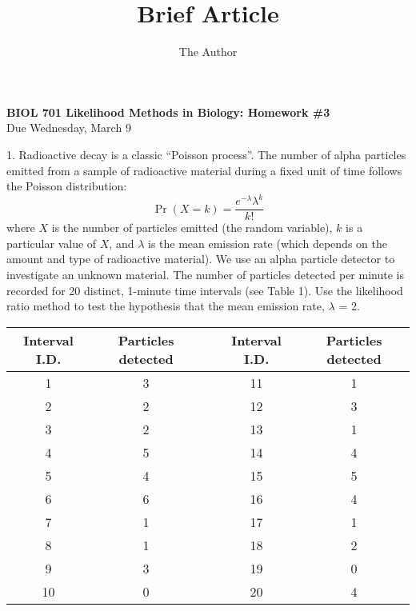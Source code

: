 \documentclass[11pt]{article}
\title{Brief Article}
\author{The Author}
\begin{document}
\begin{center}
	{\bf BIOL 701  Likelihood Methods in Biology: Homework \#3}\\
	{Due Wednesday, March 9} 
\end{center}
1. Radioactive decay is a classic ``Poisson process''.  The number of alpha particles emitted from a sample of radioactive material during a fixed unit of time follows the Poisson distribution:
$$\Pr(X=k) = \frac{e^{-\lambda}\lambda^k}{k!}$$
where $X$ is the number of particles emitted (the random variable), $k$ is a particular value of $X$, and $\lambda$ is the mean emission rate (which depends on the amount and type of radioactive material).
We use an alpha particle detector to investigate an unknown material.  The number of particles detected per minute is recorded for 20 distinct, 1-minute time intervals (see Table 1).  
Use the likelihood ratio method to test the hypothesis that the mean emission rate, $\lambda$ = 2.
\begin{table}[htdp]
\begin{center}
\begin{tabular}{c|cp{1in}c|c}
\hline
Interval	I.D. & Particles detected & & Interval	I.D. & Particles detected \\
\hline
1	& 3 & & 11	& 1 \\
2	& 2 & & 12	& 3 \\
3	& 2 & & 13	& 1 \\
4	& 5 & & 14	& 4 \\
5	& 4 & & 15	& 5 \\
6	& 6 & & 16	& 4 \\
7	& 1 & & 17	& 1 \\
8	& 1 & & 18	& 2 \\
9	& 3 & & 19	& 0 \\
10	& 0 & & 20	& 4 \\
\hline
\end{tabular}
\end{center}
\label{default}
\end{table}
\newpage
\end{document}
